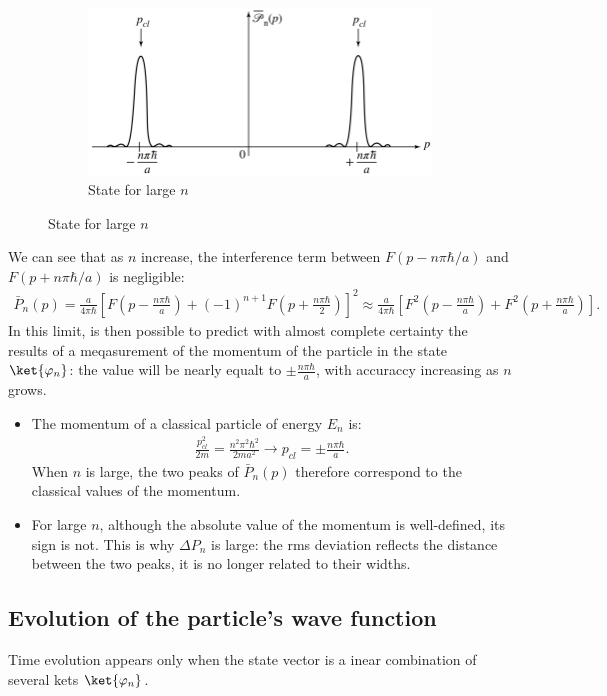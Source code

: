 \begin{figure}[h!]
    \hfill
    \begin{subfigure}{.3\columnwidth}
        \centering
        \includegraphics[width=\columnwidth]{PartOne/ChapterTwo/infinitewell_largen.png}
        \caption{State for large $n$}
    \end{subfigure}
\end{figure} 
We can see that as $n$ increase, the interference term between $F(p-n\pi\hbar/a)$ and $F(p+n\pi\hbar/a)$ is negligible:
\begin{align*}
    \bar{P}_n(p)=\frac{a}{4\pi\hbar}\left[F\left(p-\frac{n\pi\hbar}{a}\right)+(-1)^{n+1}F\left(p+\frac{n\pi\hbar}{2}\right)\right]^2\approx\frac{a}{4\pi\hbar}\left[F^2\left(p-\frac{n\pi\hbar}{a}\right)+F^2\left(p+\frac{n\pi\hbar}{a}\right)\right].
\end{align*}
In this limit, is then possible to predict with almost complete certainty the results of a meqasurement of the momentum of the particle in the state $\ket{\varphi_n}$: the value will be nearly equalt to 
$\pm\frac{n\pi\hbar}{a}$, with accuraccy increasing as $n$ grows.
\begin{itemize}[itemsep=0pt,topsep=0pt]
    \item The momentum of a classical particle of energy $E_n$ is:
    \begin{align*}
        \frac{p^2_{cl}}{2m}=\frac{n^2\pi^2\hbar^2}{2ma^2}\longrightarrow p_{cl}=\pm\frac{n\pi\hbar}{a}.
    \end{align*}
    When $n$ is large, the two peaks of $\bar{P}_n(p)$ therefore correspond to the classical values of the momentum.
    \item For large $n$, although the absolute value of the momentum is well-defined, its sign is not. This is why $\Delta P_n$ is large: the rms deviation reflects the distance 
    between the two peaks, it is no longer related to their widths.
\end{itemize}
\subsection{Evolution of the particle's wave function}
Time evolution appears only when the state vector is a inear combination of several kets $\ket{\varphi_n}$. 
%
